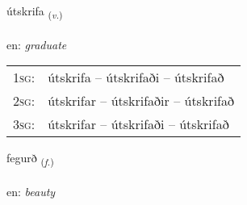 \documentclass[frontgrid, backgrid]{flacards}\usepackage[]{graphicx}\usepackage[]{xcolor}
\begin{document}
\renewcommand{\flhead}{\vskip5pt \fboxsep=0pt {\small\bfseries\footnotesize Sagnorð | Verb}}
\renewcommand{\fcfoot}{\vskip5pt \fboxsep=0pt \hspace{2pt}{\small\bfseries\footnotesize 3K}}

\renewcommand{\blhead}{\vskip5pt {\small\bfseries\footnotesize Sagnorð | Verb }}
\renewcommand{\bcfoot}{\vskip5pt \hspace{2pt}{\small\bfseries\footnotesize 3K}}


{útskrifa \small{\textsubscript{(\textit{v.})}} \\[1ex] %
\textphonetic{[utskrɪva]} \\
en: \emph{graduate} \\  [2ex]
\renewcommand*{\arraystretch}{0.8}
\begin{tabular}{p{1cm}l}
\textsc{1sg}: & útskrifa -- útskrifaði -- útskrifað \\ 
\textsc{2sg}: & útskrifar -- útskrifaðir -- útskrifað \\ 
\textsc{3sg}: & útskrifar -- útskrifaði -- útskrifað \\ 
\end{tabular}
}

\renewcommand{\flhead}{\vskip5pt \fboxsep=0pt {\small\bfseries\footnotesize Nafnorð | Noun}}
\renewcommand{\fcfoot}{\vskip5pt \fboxsep=0pt \hspace{2pt}{\small\bfseries\footnotesize 3K}}

\renewcommand{\blhead}{\vskip5pt {\small\bfseries\footnotesize Nafnorð | Noun }}
\renewcommand{\bcfoot}{\vskip5pt \hspace{2pt}{\small\bfseries\footnotesize 3K}}


{fegurð \small{\textsubscript{(\textit{f.})}} \\[1ex] %
\textphonetic{[fɛːɣʏrð]} \\
en: \emph{beauty} \\  [2ex]
\renewcommand*{\arraystretch}{0.8}
}
\end{document}
